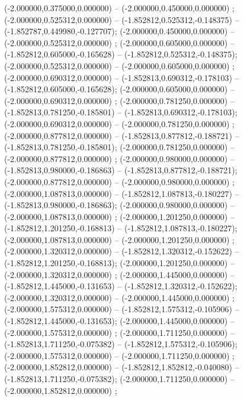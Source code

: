  (-2.000000,0.375000,0.000000) -- (-2.000000,0.450000,0.000000) ;
 (-2.000000,0.525312,0.000000) -- (-1.852812,0.525312,-0.148375) -- (-1.852787,0.449980,-0.127707);
 (-2.000000,0.450000,0.000000) -- (-2.000000,0.525312,0.000000) ;
 (-2.000000,0.605000,0.000000) -- (-1.852812,0.605000,-0.165628) -- (-1.852812,0.525312,-0.148375);
 (-2.000000,0.525312,0.000000) -- (-2.000000,0.605000,0.000000) ;
 (-2.000000,0.690312,0.000000) -- (-1.852813,0.690312,-0.178103) -- (-1.852812,0.605000,-0.165628);
 (-2.000000,0.605000,0.000000) -- (-2.000000,0.690312,0.000000) ;
 (-2.000000,0.781250,0.000000) -- (-1.852813,0.781250,-0.185801) -- (-1.852813,0.690312,-0.178103);
 (-2.000000,0.690312,0.000000) -- (-2.000000,0.781250,0.000000) ;
 (-2.000000,0.877812,0.000000) -- (-1.852813,0.877812,-0.188721) -- (-1.852813,0.781250,-0.185801);
 (-2.000000,0.781250,0.000000) -- (-2.000000,0.877812,0.000000) ;
 (-2.000000,0.980000,0.000000) -- (-1.852813,0.980000,-0.186863) -- (-1.852813,0.877812,-0.188721);
 (-2.000000,0.877812,0.000000) -- (-2.000000,0.980000,0.000000) ;
 (-2.000000,1.087813,0.000000) -- (-1.852812,1.087813,-0.180227) -- (-1.852813,0.980000,-0.186863);
 (-2.000000,0.980000,0.000000) -- (-2.000000,1.087813,0.000000) ;
 (-2.000000,1.201250,0.000000) -- (-1.852812,1.201250,-0.168813) -- (-1.852812,1.087813,-0.180227);
 (-2.000000,1.087813,0.000000) -- (-2.000000,1.201250,0.000000) ;
 (-2.000000,1.320312,0.000000) -- (-1.852812,1.320312,-0.152622) -- (-1.852812,1.201250,-0.168813);
 (-2.000000,1.201250,0.000000) -- (-2.000000,1.320312,0.000000) ;
 (-2.000000,1.445000,0.000000) -- (-1.852812,1.445000,-0.131653) -- (-1.852812,1.320312,-0.152622);
 (-2.000000,1.320312,0.000000) -- (-2.000000,1.445000,0.000000) ;
 (-2.000000,1.575312,0.000000) -- (-1.852812,1.575312,-0.105906) -- (-1.852812,1.445000,-0.131653);
 (-2.000000,1.445000,0.000000) -- (-2.000000,1.575312,0.000000) ;
 (-2.000000,1.711250,0.000000) -- (-1.852813,1.711250,-0.075382) -- (-1.852812,1.575312,-0.105906);
 (-2.000000,1.575312,0.000000) -- (-2.000000,1.711250,0.000000) ;
 (-2.000000,1.852812,0.000000) -- (-1.852812,1.852812,-0.040080) -- (-1.852813,1.711250,-0.075382);
 (-2.000000,1.711250,0.000000) -- (-2.000000,1.852812,0.000000) ;
